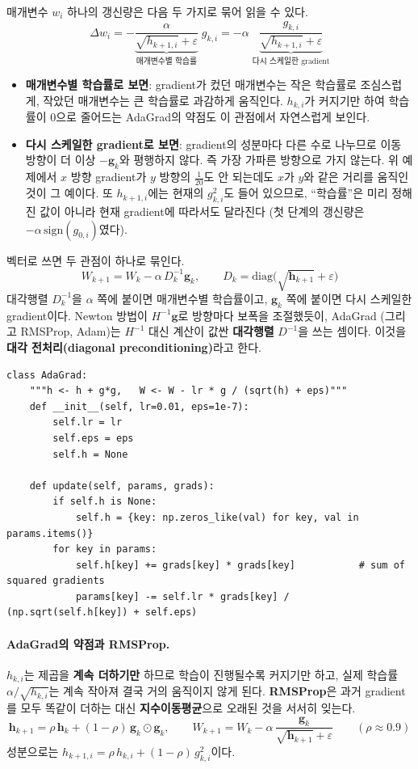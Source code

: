 \documentclass[11pt,a4paper]{article}
\begin{document}
\begin{remarkbox}[두 가지로 읽는 같은 식]
매개변수 $w_i$ 하나의 갱신량은 다음 두 가지로 묶어 읽을 수 있다.
\[
\Delta w_i
=-\underbrace{\frac{\alpha}{\sqrt{h_{k+1,i}}+\varepsilon}}_{\text{매개변수별 학습률}}\;g_{k,i}
=-\alpha\;\underbrace{\frac{g_{k,i}}{\sqrt{h_{k+1,i}}+\varepsilon}}_{\text{다시 스케일한 gradient}}
\]
\begin{itemize}[leftmargin=1.5em]
\item \textbf{매개변수별 학습률로 보면}: gradient가 컸던 매개변수는 작은 학습률로 조심스럽게,
작았던 매개변수는 큰 학습률로 과감하게 움직인다.
$h_{k,i}$가 커지기만 하여 학습률이 $0$으로 줄어드는 AdaGrad의 약점도 이 관점에서 자연스럽게 보인다.
\item \textbf{다시 스케일한 gradient로 보면}: gradient의 성분마다 다른 수로 나누므로
이동 방향이 더 이상 $-\bm g_k$와 평행하지 않다. 즉 가장 가파른 방향으로 가지 않는다.
위 예제에서 $x$ 방향 gradient가 $y$ 방향의 $\frac{1}{20}$도 안 되는데도 $x$가 $y$와 같은 거리를 움직인 것이 그 예이다.
또 $h_{k+1,i}$에는 현재의 $g_{k,i}^2$도 들어 있으므로, ``학습률''은 미리 정해진 값이 아니라 현재 gradient에 따라서도 달라진다
(첫 단계의 갱신량은 $-\alpha\,\mathrm{sign}(g_{0,i})$였다).
\end{itemize}
벡터로 쓰면 두 관점이 하나로 묶인다.
\[
W_{k+1}=W_k-\alpha\,D_k^{-1}\bm g_k,
\qquad
D_k=\mathrm{diag}\bigl(\sqrt{\bm h_{k+1}}+\varepsilon\bigr)
\]
대각행렬 $D_k^{-1}$을 $\alpha$ 쪽에 붙이면 매개변수별 학습률이고, $\bm g_k$ 쪽에 붙이면 다시 스케일한 gradient이다.
Newton 방법이 $H^{-1}\bm g$로 방향마다 보폭을 조절했듯이, AdaGrad (그리고 RMSProp, Adam)는
$H^{-1}$ 대신 계산이 값싼 \textbf{대각행렬} $D^{-1}$을 쓰는 셈이다.
이것을 \textbf{대각 전처리(diagonal preconditioning)}라고 한다.
\end{remarkbox}

\begin{lstlisting}
class AdaGrad:
    """h <- h + g*g,   W <- W - lr * g / (sqrt(h) + eps)"""
    def __init__(self, lr=0.01, eps=1e-7):
        self.lr = lr
        self.eps = eps
        self.h = None

    def update(self, params, grads):
        if self.h is None:
            self.h = {key: np.zeros_like(val) for key, val in params.items()}
        for key in params:
            self.h[key] += grads[key] * grads[key]           # sum of squared gradients
            params[key] -= self.lr * grads[key] / (np.sqrt(self.h[key]) + self.eps)
\end{lstlisting}

\paragraph{AdaGrad의 약점과 RMSProp.}
$h_{k,i}$는 제곱을 \textbf{계속 더하기만} 하므로 학습이 진행될수록 커지기만 하고,
실제 학습률 $\alpha/\sqrt{h_{k,i}}$는 계속 작아져 결국 거의 움직이지 않게 된다.
\textbf{RMSProp}은 과거 gradient를 모두 똑같이 더하는 대신 \textbf{지수이동평균}으로 오래된 것을 서서히 잊는다.
\[
\boxed{
\bm h_{k+1}=\rho\,\bm h_k+(1-\rho)\,\bm g_k\odot\bm g_k,
\qquad
W_{k+1}=W_k-\alpha\,\frac{\bm g_k}{\sqrt{\bm h_{k+1}}+\varepsilon}
}
\qquad(\rho\approx0.9)
\]
성분으로는 $h_{k+1,i}=\rho\,h_{k,i}+(1-\rho)\,g_{k,i}^2$이다.
\end{document}
